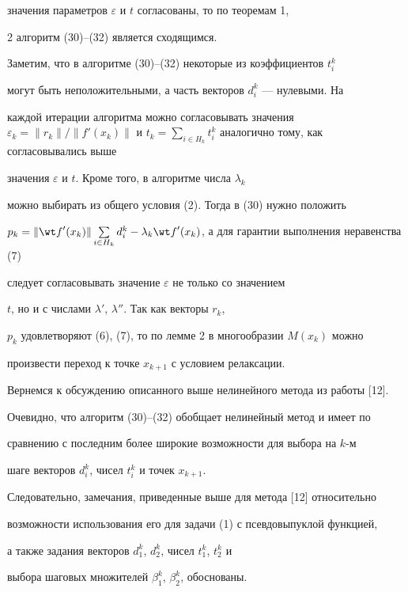 значения параметров $\varepsilon $ и $t$ согласованы, то по теоремам 1,


2 алгоритм (30)--(32) является сходящимся.





Заметим, что в алгоритме (30)--(32) некоторые из коэффициентов $t_i^k$


могут быть неположительными, а часть векторов $d_i^k$ --- нулевыми. На


каждой итерации алгоритма можно согласовывать значения $\varepsilon_k=


\|{r_k}\|/\|{{f}'(x_k)}\|$ и $t_k=\sum


\limits_{i\in H_k}t_i^k$ аналогично тому, как согласовывались выше


значения $\varepsilon$ и $t$. Кроме того, в алгоритме числа $\lambda_k$


можно выбирать из общего условия (2). Тогда в (30) нужно положить


$p_k=\|{{\wt f}'(x_k)}\|\sum\limits_{i\in H_k} d_i^k -


\lambda_k{\wt f}'(x_k)$, а для гарантии выполнения неравенства (7)


следует согласовывать значение $\varepsilon$ не только со значением


$t$, но и с числами ${\lambda}'$, ${\lambda}''$. Так как векторы $r_k$,


$p_k$ удовлетворяют (6), (7), то по лемме 2 в многообразии $M(x_k)$ можно


произвести переход к точке $x_{k+1}$ с условием релаксации.





Вернемся к обсуждению описанного выше нелинейного метода из работы [12].


Очевидно, что алгоритм (30)--(32) обобщает нелинейный метод и имеет по


сравнению с последним более широкие возможности для выбора на $k$-м


шаге векторов $d_i^k$, чисел $t_i^k$ и точек $x_{k+1}$.


Следовательно, замечания, приведенные выше для метода [12] относительно


возможности использования его для задачи (1) с псевдовыпуклой функцией,


а также задания векторов $d_1^k$, $d_2^k$, чисел $t_1^k$, $t_2^k$ и


выбора шаговых множителей $\beta_1^k$, $\beta_2^k$, обоснованы.


